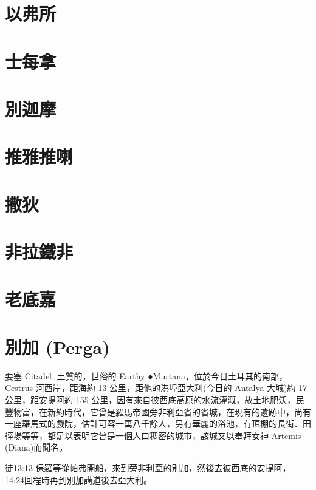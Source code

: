 \section{以弗所}

\section{士每拿}

\section{別迦摩}

\section{推雅推喇}


\section{撒狄}


\section{非拉鐵非}


\section{老底嘉}
\section{別加   (Perga)}

要塞 Citadel, 土質的，世俗的 Earthy
●Murtana，位於今日土耳其的南部，Cestrus 河西岸，距海約 13 公里，距他的港埠亞大利(今日的 Antalya 大城)約 17 公里，距安提阿約 155 公里，因有來自彼西底高原的水流灌溉，故土地肥沃，民豐物富，在新約時代，它曾是羅馬帝國旁非利亞省的省城，在現有的遺跡中，尚有一座羅馬式的戲院，估計可容一萬八千餘人，另有華麗的浴池，有頂棚的長街、田徑場等等，都足以表明它曾是一個人口稠密的城市，該城又以奉拜女神 Artemis (Diana)而聞名。

徒13:13 保羅等從帕弗開船，來到旁非利亞的別加，然後去彼西底的安提阿，
14:24回程時再到別加講道後去亞大利。

